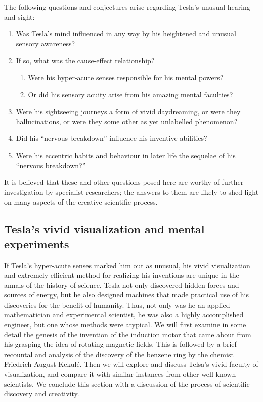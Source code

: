 \documentclass[
  11pt,
  a4paper,
]{article}
\providecommand{\tightlist}{%
  \setlength{\itemsep}{0pt}\setlength{\parskip}{0pt}}
\begin{document}
The following questions and conjectures arise regarding Tesla's unusual
hearing and sight:

\begin{enumerate}
\tightlist
\item
  Was Tesla's mind influenced in any way by his heightened and unusual
  sensory awareness?
\item
  If so, what was the cause-effect relationship?

  \begin{enumerate}
  \def\labelenumii{\alph{enumii}.}
  \tightlist
  \item
    Were his hyper-acute senses responsible for his mental powers?
  \item
    Or did his sensory acuity arise from his amazing mental faculties?
  \end{enumerate}
\item
  Were his sightseeing journeys a form of vivid daydreaming, or were
  they hallucinations, or were they some other as yet unlabelled
  phenomenon?
\item
  Did his ``nervous breakdown'' influence his inventive abilities?
\item
  Were his eccentric habits and behaviour in later life the sequelae of
  his ``nervous breakdown?''
\end{enumerate}

It is believed that these and other questions posed here are worthy of
further investigation by specialist researchers; the answers to them are
likely to shed light on many aspects of the creative scientific process.

\hypertarget{teslas-vivid-visualization-and-mental-experiments}{%
\subsection{Tesla's vivid visualization and mental
experiments}\label{teslas-vivid-visualization-and-mental-experiments}}

If Tesla's hyper-acute senses marked him out as unusual, his vivid
visualization and extremely efficient method for realizing his
inventions are unique in the annals of the history of science. Tesla not
only discovered hidden forces and sources of energy, but he also
designed machines that made practical use of his discoveries for the
benefit of humanity. Thus, not only was he an applied mathematician and
experimental scientist, he was also a highly accomplished engineer, but
one whose methods were atypical. We will first examine in some detail
the genesis of the invention of the induction motor that came about from
his grasping the idea of rotating magnetic fields. This is followed by a
brief recountal and analysis of the discovery of the benzene ring by the
chemist Friedrich August Kekulé. Then we will explore and discuss
Telsa's vivid faculty of visualization, and compare it with similar
instances from other well known scientists. We conclude this section
with a discussion of the process of scientific discovery and creativity.
\end{document}
